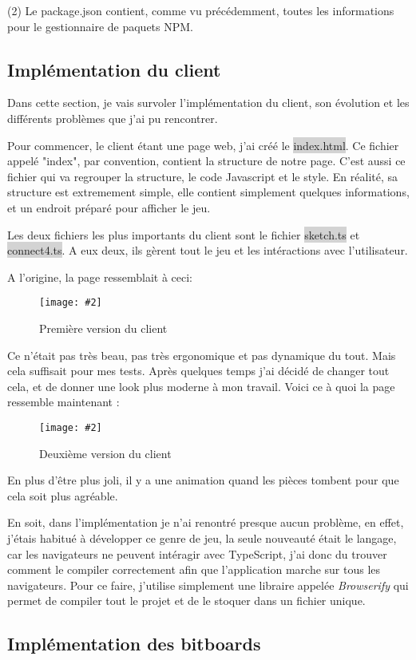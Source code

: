 \documentclass[a4paper]{article}
\newcommand{\img}[3][]{
    \begin{figure}[H]
        \centering
        \texttt{[image: \#2]}
        \caption{#1}    
    \end{figure}
}
\newcommand{\inlinecode}[1]{\colorbox{lightgray}{#1}}
\begin{document}
	(2) Le package.json contient, comme vu précédemment, toutes les informations pour le gestionnaire de paquets NPM.

\subsection{Implémentation du client}    

    Dans cette section, je vais survoler l'implémentation du client, son évolution et les différents problèmes que j'ai pu rencontrer.

    Pour commencer, le client étant une page web, j'ai créé le \inlinecode{index.html}. Ce fichier appelé "index", par convention, contient la structure de notre page. C'est aussi ce fichier qui va regrouper la structure, le code Javascript et le style. En réalité, sa structure est extremement simple, elle contient simplement quelques informations, et un endroit préparé pour afficher le jeu.

    Les deux fichiers les plus importants du client sont le fichier \inlinecode{sketch.ts} et \inlinecode{connect4.ts}. A eux deux, ils gèrent tout le jeu et les intéractions avec l'utilisateur.

    A l'origine, la page ressemblait à ceci:
    \img[Première version du client]{Images/FirstClientPreview.png}{0.8}

    Ce n'était pas très beau, pas très ergonomique et pas dynamique du tout. Mais cela suffisait pour mes tests. Après quelques temps j'ai décidé de changer tout cela, et de donner une look plus moderne à mon travail. Voici ce à quoi la page ressemble maintenant :
    \img[Deuxième version du client]{Images/SecondClientPreview.png}{0.8}
    En plus d'être plus joli, il y a une animation quand les pièces tombent pour que cela soit plus agréable.

    En soit, dans l'implémentation je n'ai renontré presque aucun problème, en effet, j'étais habitué à développer ce genre de jeu, la seule nouveauté était le langage, car les navigateurs ne peuvent intéragir avec TypeScript, j'ai donc du trouver comment le compiler correctement afin que l'application marche sur tous les navigateurs. Pour ce faire, j'utilise simplement une libraire appelée \textit{Browserify} qui permet de compiler tout le projet et de le stoquer dans un fichier unique.

\subsection{Implémentation des bitboards}
\end{document}

